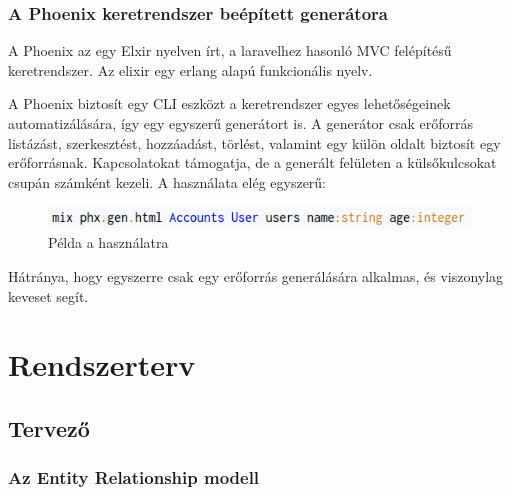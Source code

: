 \documentclass[a4paper,12pt,oneside]{report}
\begin{document}
\newpage
\subsubsection{A Phoenix keretrendszer beépített generátora}

\begin{justify}
	A Phoenix az egy Elxir nyelven írt, a laravelhez hasonló MVC felépítésű keretrendszer. Az elixir egy erlang alapú funkcionális nyelv. 

	A Phoenix biztosít egy CLI eszközt a keretrendszer egyes lehetőségeinek automatizálására, így egy egyszerű generátort is. A generátor csak erőforrás listázást, szerkesztést, hozzáadást, törlést, valamint egy külön oldalt biztosít egy erőforrásnak. Kapcsolatokat támogatja, de a generált felületen a külsőkulcsokat csupán számként kezeli. A használata elég egyszerű: 

	\begin{figure}[h]
		\includegraphics[width=\textwidth]{contents/images/mix_phx_gen_html.png}
		\caption{Példa a használatra}
		\label{fig:mix_phx_gen_html}
	\end{figure}

	Hátránya, hogy egyszerre csak egy erőforrás generálására alkalmas, és viszonylag keveset segít.

\end{justify}

\newpage
\section{Rendszerterv}
\subsection{Tervező}
\subsubsection{Az Entity Relationship modell}
\end{document}
